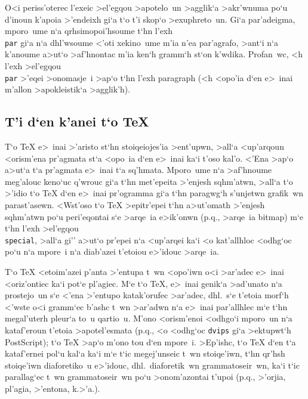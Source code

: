 O<i periss'oterec l'exeic >el'egqou >apotelo~un >agglik`a >akr'wnuma 
po`u d'inoun k'apoia >'endeixh gi`a t`o t'i skop`o
>exu\-phreto~un.  Gi`a par'a\-deigma, mpo\-ro~ume n`a qrhsimopoi'hsoume
t`hn l'exh {\tt \\par} gi`a n`a dhl'wsoume <'oti xekino~ume m'ia n'ea
par'agrafo, >ant`i n`a k'anoume a>ut`o >af'h\-nontac m'ia ken`h
gramm`h st`on k'wdika.  Profan~wc, <h l'exh >el'egqou {\tt \\par} >'eqei
>onomasje~i >ap`o t`hn l'exh {\rm paragraph} (<h <opo'ia d`en e>~inai
m'al\-lon >apokleistik`a >ag\-glik'h).

\subsection{T'i d`en k'anei t`o {\lsecfont \TeX}}

T`o {\rm \TeX} e>~inai >'aristo st`hn stoiqeiojes'ia >ent'upwn, >all`a  
<up'arqoun <orism'ena pr'agmata st`a <opo~ia d`en e>~inai ka`i t'oso
kal'o.  <'Ena >ap`o a>ut`a t`a pr'agmata e>~inai t`a sq'hmata. Mporo~ume
n`a >af'hnoume meg'alouc keno`uc q'wrouc gi`a t`hn met'epeita >'enjesh
sqhm'atwn, >all`a t`o >'idio t`o {\rm \TeX} d`en e>~inai pr'ogramma gi`a
t`hn paragwg`h s'unjetwn grafik~wn parast'asewn.  <Wst'oso t`o {\rm
\TeX} >epitr'epei t`hn a>ut'o\-math >'enjesh sqhm'atwn po`u peri'eqontai
s`e >arqe~ia e>ik'onwn (p.q., >arqe~ia {\rm bitmap}) m`e t`hn l'exh
>el'egqou {\tt \\special}, >all`a gi'' a>ut`o pr'epei
n`a <up'arqei ka`i <o ka\-t'al\-lhloc <odhg`oc po`u n`a mpore~i n`a
diab'azei t'etoiou e>'idouc >arqe~ia.

T`o {\rm \TeX} <etoim'azei p'anta >'entupa t~wn <opo'iwn o<i >ar'adec   
e>~inai <oriz'ontiec ka`i pot`e pl'agiec.  M`e t`o {\rm \TeX}, e>~inai  
genik`a >ad'unato n`a pro\-stejo~un s`e <'ena >'entupo katak'orufec
>ar'adec, dhl.\ s`e t'etoia morf`h <'wste o<i gramm`ec b'ashc t~wn
>ar'adwn n`a e>~inai par'allhlec m`e t`hn me\-ga\-l'u\-te\-rh pleu\-r`a
to~u qartio~u.  M'ono <orism'enoi <odhgo`i mporo~un n`a kataf'eroun
t'etoia >apotel'esmata  (p.q., <o <odhg`oc {\tt dvips} gi`a >ektu\-pwt`h
{\rm Post\-Script}); t`o {\rm \TeX} >ap`o m'ono tou d`en mpore~i. 
>Ep'ishc, t`o {\rm \TeX} d`en t`a kataf'ernei pol`u kal`a ka`i m`e t`ic
megej'unseic t~wn stoiqe'iwn, t`hn qr'hsh stoiqe'iwn diaforetiko~u
e>'idouc, dhl.\ diaforetik~wn {\tengs grammatoseir~wn}, ka`i t`ic
parallag`ec t~wn grammatoseir~wn po`u >onom'azontai {\tengs t'upoi\/}
(p.q., >'orjia, pl'agia, >'entona, k.>'a.). 

